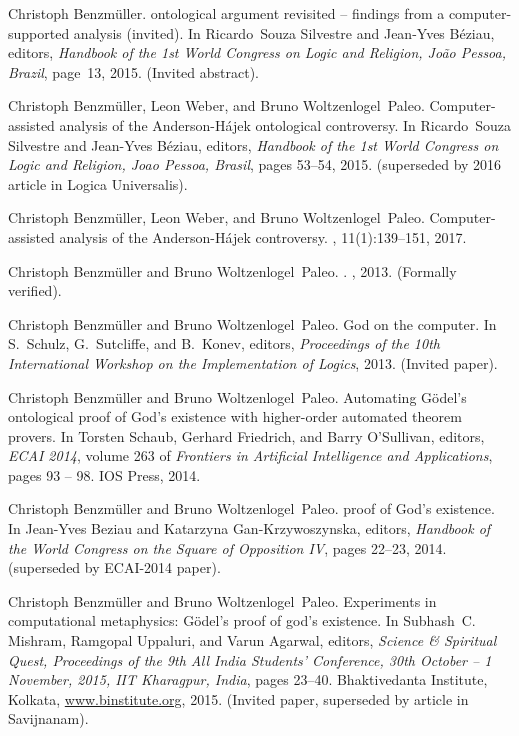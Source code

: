 \documentclass{llncs}
\begin{document}
\begin{thebibliography}{10}
Christoph Benzm{\"u}ller.
 ontological argument revisited -- findings from a
  computer-supported analysis (invited).
\newblock In Ricardo~Souza Silvestre and Jean-Yves B\'eziau, editors, {\em
  Handbook of the 1st World Congress on Logic and Religion, Jo\~ao Pessoa,
  Brazil}, page~13, 2015.
\newblock (Invited abstract).

Christoph Benzm{\"u}ller, Leon Weber, and Bruno Woltzenlogel~Paleo.
\newblock Computer-assisted analysis of the {Anderson-H\'{a}jek} ontological
  controversy.
\newblock In Ricardo~Souza Silvestre and Jean-Yves B\'eziau, editors, {\em
  Handbook of the 1st World Congress on Logic and Religion, Joao Pessoa,
  Brasil}, pages 53--54, 2015.
\newblock (superseded by 2016 article in Logica Universalis).

Christoph Benzm{\"u}ller, Leon Weber, and Bruno Woltzenlogel~Paleo.
\newblock Computer-assisted analysis of the {Anderson-H\'{a}jek} controversy.
, 11(1):139--151, 2017.

Christoph Benzm\"uller and Bruno Woltzenlogel~Paleo.
.
, 2013.
\newblock (Formally verified).

Christoph Benzm\"uller and Bruno Woltzenlogel~Paleo.
 {God} on the computer.
\newblock In S.~Schulz, G.~Sutcliffe, and B.~Konev, editors, {\em Proceedings
  of the 10th International Workshop on the Implementation of Logics}, 2013.
\newblock (Invited paper).

Christoph Benzm{\"u}ller and Bruno Woltzenlogel~Paleo.
\newblock Automating {G\"{o}del's} ontological proof of {God}'s existence with
  higher-order automated theorem provers.
\newblock In Torsten Schaub, Gerhard Friedrich, and Barry O'Sullivan, editors,
  {\em ECAI 2014}, volume 263 of {\em Frontiers in Artificial Intelligence and
  Applications}, pages 93 -- 98. IOS Press, 2014.

Christoph Benzm{\"u}ller and Bruno Woltzenlogel~Paleo.
 proof of {God's} existence.
\newblock In Jean-Yves Beziau and Katarzyna Gan-Krzywoszynska, editors, {\em
  Handbook of the World Congress on the Square of Opposition IV}, pages 22--23,
  2014.
\newblock (superseded by ECAI-2014 paper).

Christoph Benzm{\"u}ller and Bruno Woltzenlogel~Paleo.
\newblock Experiments in computational metaphysics: {G\"odel's} proof of god's
  existence.
\newblock In Subhash~C. Mishram, Ramgopal Uppaluri, and Varun Agarwal, editors,
  {\em Science \& Spiritual Quest, Proceedings of the 9th All India Students'
  Conference, 30th October -- 1 November, 2015, IIT Kharagpur, India}, pages
  23--40. Bhaktivedanta Institute, Kolkata, \url{www.binstitute.org}, 2015.
\newblock (Invited paper, superseded by article in Savijnanam).


\end{thebibliography}
\end{document}

